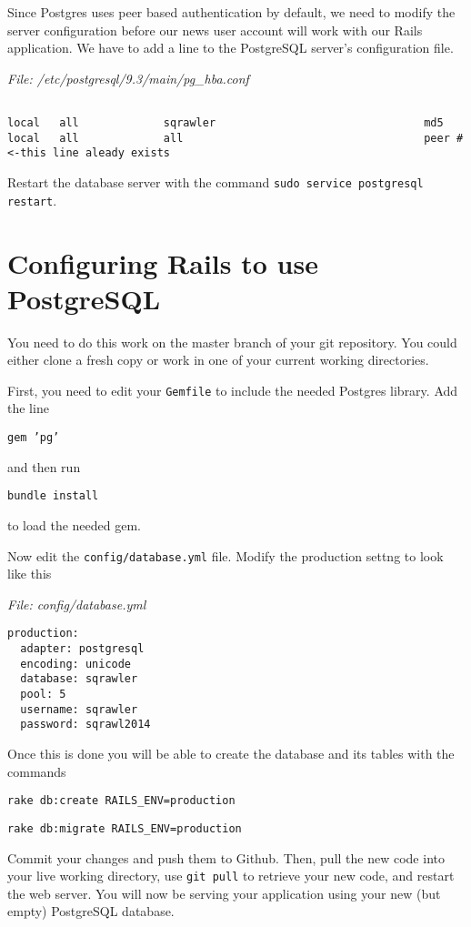 \documentclass{article}
\begin{document}
Since Postgres uses peer based authentication by default, we need to modify the server configuration before our news user account will work with our Rails application.  We have to add a line to the PostgreSQL server's configuration file.

\emph{File:  /etc/postgresql/9.3/main/pg\_hba.conf}

\begin{verbatim}

local   all             sqrawler                                md5
local   all             all                                     peer # <-this line aleady exists

\end{verbatim}

Restart the database server with the command \texttt{sudo service postgresql restart}.

\section{Configuring Rails to use PostgreSQL}
You need to do this work on the master branch of your git repository.  You could either clone a fresh copy or work in one
of your current working directories.

First, you need to edit your \texttt{Gemfile} to include the needed Postgres library.  Add the line

\texttt{gem 'pg'}

and then run

\texttt{bundle install}

to load the needed gem.

Now edit the \texttt{config/database.yml} file.  Modify the production settng to look like this

\emph{File:  config/database.yml}

\begin{verbatim}
production:
  adapter: postgresql
  encoding: unicode
  database: sqrawler
  pool: 5
  username: sqrawler
  password: sqrawl2014
\end{verbatim}

Once this is done you will be able to create the database and its tables with the commands

\texttt{rake db:create RAILS\_ENV=production}

\texttt{rake db:migrate RAILS\_ENV=production}

Commit your changes and push them to Github.  Then, pull the new code into your live working directory, use \texttt{git pull} to retrieve your new code, and restart the web server.  You will now be serving your application using your new (but empty) PostgreSQL database.
\end{document}
